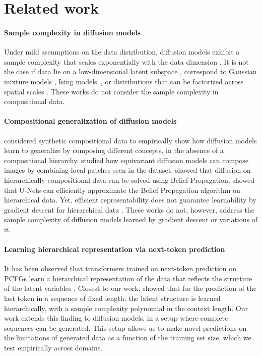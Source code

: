 \section{Related work}
\paragraph{Sample complexity in diffusion models}

Under mild assumptions on the data distribution, diffusion models exhibit a sample complexity that scales exponentially with the data dimension \cite{block2020generative,oko2023diffusion}. It is not the case if data lie on a low-dimensional latent subspace \cite{de2022convergence,chen2023score,yuan2023reward}, correspond to Gaussian mixture models \cite{biroli2023generative,shah2023learning, Cui2023AnalysisOL}, Ising models~\cite{mei2023deep}, or distributions that can be factorized across spatial scales \cite{kadkhodaie2023learning}. These works do not consider the sample complexity in compositional data. 

\paragraph{Compositional generalization of diffusion models}

 \citet{okawa2023compositional} considered synthetic compositional data to empirically show how diffusion models learn to generalize by composing different concepts, in the absence of a compositional hierarchy. \citet{kamb2024analytic} studied how equivariant diffusion models can compose images by combining local patches seen in the dataset. \citet{sclocchi2024phase,sclocchi2024probing} showed that diffusion on hierarchically compositional data can be solved using Belief Propagation. \citet{mei2024unets} showed that U-Nets can efficiently approximate the Belief Propagation algorithm on hierarchical data. Yet, efficient representability does not guarantee learnability by gradient descent for hierarchical data \citep{cagnetta2023deep}. These works do not, however, address the sample complexity of diffusion models learned by gradient descent or variations of it.

\paragraph{Learning hierarchical representation via next-token prediction}

It has been observed that transformers trained on next-token prediction on PCFGs learn a hierarchical representation of the data that reflects the structure of the latent variables \citep{cagnetta2024towards, allen2023physics,garnier2024transformers}. Closest to our work, \citet{cagnetta2024towards} showed that for the prediction of the last token in a sequence of fixed length, the latent structure is learned hierarchically, with a sample complexity polynomial in the context length. Our work extends this finding to diffusion models, in a setup where complete sequences can be generated. This setup allows us to make novel predictions on the limitations of generated data as a function of the training set size, which we test empirically across domains.